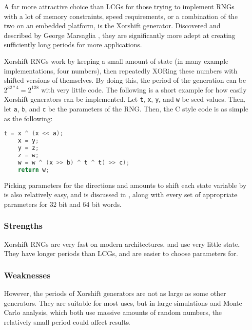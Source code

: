 A far more attractive choice than LCGs for those trying to implement RNGs with a lot of memory constraints, speed requirements, or a combination of the two on an embedded platform, is the Xorshift generator. Discovered and described by George Marsaglia \cite{marsaglia2003xorshift}, they are significantly more adept at creating sufficiently long periods for more applications.

Xorshift RNGs work by keeping a small amount of state (in many example implementations, four numbers), then repeatedly XORing these numbers with shifted versions of themselves. By doing this, the period of the generation can be $2^{32 * 4} = 2^{128}$ with very little code. The following is a short example for how easily Xorshift generators can be implemented. Let \texttt{t}, \texttt{x}, \texttt{y}, and \texttt{w} be seed values. Then, let \texttt{a}, \texttt{b}, and \texttt{c} be the parameters of the RNG. Then, the C style code is as simple as the following:

\begin{lstlisting}[frame=single,language=C,basicstyle=\ttfamily]
    t = x ^ (x << a);
    x = y;
    y = z;
    z = w;
    w = w ^ (x >> b) ^ t ^ t( >> c);
    return w;
\end{lstlisting}

Picking parameters for the directions and amounts to shift each state variable by is also relatively easy, and is discussed in \cite{marsaglia2003xorshift}, along with every set of appropriate parameters for 32 bit and 64 bit words.

\subsubsection{Strengths}

Xorshift RNGs are very fast on modern architectures, and use very little state. They have longer periods than LCGs, and are easier to choose parameters for.

\subsubsection{Weaknesses}

However, the periods of Xorshift generators are not as large as some other generators. They are suitable for most uses, but in large simulations and Monte Carlo analysis, which both use massive amounts of random numbers, the relatively small period could affect results.
